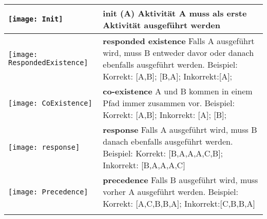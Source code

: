 \begin{longtable}{|p{}|p{}|}
\begin{center}

  \texttt{[image: Init]} %
    \end{center}

& \textbf{init (A)}\newline
Aktivität A muss als erste Aktivität ausgeführt werden\\
\hline


\begin{center}

  \texttt{[image: RespondedExistence]} %
    \end{center}&

\textbf{responded existence} \newline  Falls A ausgeführt wird, muss B entweder davor oder danach ebenfalls ausgeführt werden. \newline
Beispiel: Korrekt: [A,B]; [B,A]; Inkorrekt:[A];\\
\hline
\begin{center}

  \texttt{[image: CoExistence]} %
    \end{center} &
\textbf{co-existence} \newline A und B kommen in einem Pfad immer zusammen vor.\newline
Beispiel: Korrekt: [A,B]; Inkorrekt: [A]; [B];
 \\
\hline

\begin{center}

  \texttt{[image: response]} %
    \end{center} &
\textbf{response} \newline Falls A ausgeführt wird, muss B danach ebenfalls ausgeführt werden. \newline
Beispiel: Korrekt: [B,A,A,A,C,B]; Inkorrekt: [B,A,A,A,C]
\\
\hline
\begin{center}

  \texttt{[image: Precedence]} %
    \end{center} &
    \textbf{precedence}\newline
Falls B  ausgeführt wird, muss vorher A ausgeführt werden. \newline
Beispiel: Korrekt: [A,C,B,B,A]; Inkorrekt:[C,B,B,A]
\\
\hline
\begin{center}


\end{center}
\end{longtable}
